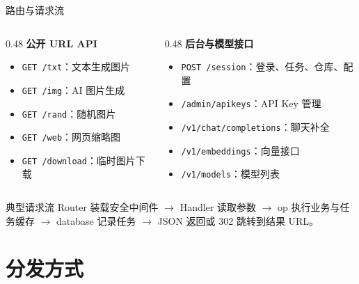 \documentclass[aspectratio=169,UTF8]{ctexbeamer}
\newcommand{\code}[1]{\texttt{#1}}
\begin{document}
\begin{frame}{路由与请求流}
  \begin{columns}[T]
    \begin{column}{0.48\linewidth}
      \textbf{公开 URL API}
      \begin{itemize}
        \item \code{GET /txt}：文本生成图片
        \item \code{GET /img}：AI 图片生成
        \item \code{GET /rand}：随机图片
        \item \code{GET /web}：网页缩略图
        \item \code{GET /download}：临时图片下载
      \end{itemize}
    \end{column}
    \begin{column}{0.48\linewidth}
      \textbf{后台与模型接口}
      \begin{itemize}
        \item \code{POST /session}：登录、任务、仓库、配置
        \item \code{/admin/apikeys}：API Key 管理
        \item \code{/v1/chat/completions}：聊天补全
        \item \code{/v1/embeddings}：向量接口
        \item \code{/v1/models}：模型列表
      \end{itemize}
    \end{column}
  \end{columns}

  \vspace{0.4cm}
  \begin{block}{典型请求流}
    Router 装载安全中间件 $\rightarrow$ Handler 读取参数 $\rightarrow$ op 执行业务与任务缓存 $\rightarrow$ database 记录任务 $\rightarrow$ JSON 返回或 302 跳转到结果 URL。
  \end{block}
\end{frame}

\section{分发方式}
\end{document}

